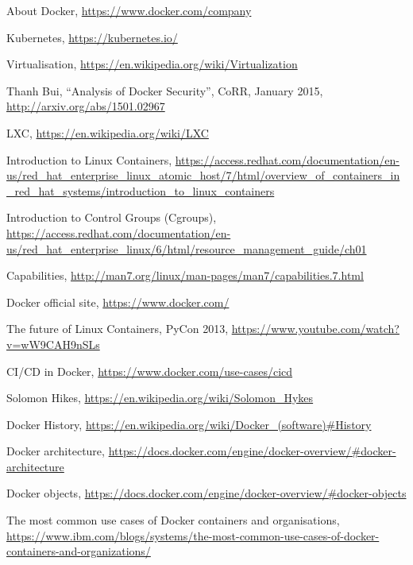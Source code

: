 \documentclass[a4paper,12pt]{article}
\begin{document}
\newpage

\begin{thebibliography}{99}

About Docker, \url{https://www.docker.com/company}

Kubernetes, \url{https://kubernetes.io/}

Virtualisation,
\url{https://en.wikipedia.org/wiki/Virtualization}

Thanh Bui, 
``Analysis of Docker Security'', 
CoRR,
January 2015,
\url{http://arxiv.org/abs/1501.02967}

LXC, \url{https://en.wikipedia.org/wiki/LXC}

Introduction to Linux Containers, \url{https://access.redhat.com/documentation/en-us/red_hat_enterprise_linux_atomic_host/7/html/overview_of_containers_in_red_hat_systems/introduction_to_linux_containers}
  
Introduction to Control Groups (Cgroups),
\url{https://access.redhat.com/documentation/en-us/red_hat_enterprise_linux/6/html/resource_management_guide/ch01}

Capabilities, \url{http://man7.org/linux/man-pages/man7/capabilities.7.html}

Docker official site, \url{https://www.docker.com/}

The future of Linux Containers, PyCon 2013,
\url{https://www.youtube.com/watch?v=wW9CAH9nSLs}

CI/CD in Docker, \url{https://www.docker.com/use-cases/cicd}

Solomon Hikes,
\url{https://en.wikipedia.org/wiki/Solomon_Hykes}

Docker History,
\url{https://en.wikipedia.org/wiki/Docker_(software)#History}

Docker architecture,
\url{https://docs.docker.com/engine/docker-overview/#docker-architecture}

Docker objects,
\url{https://docs.docker.com/engine/docker-overview/#docker-objects}

The most common use cases of Docker containers and organisations,
\url{https://www.ibm.com/blogs/systems/the-most-common-use-cases-of-docker-containers-and-organizations/}


\end{thebibliography}
\end{document}
